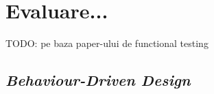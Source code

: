 \chapter{Evaluare...}

TODO: pe baza paper-ului de functional testing

\section{\emph{Behaviour-Driven Design}}